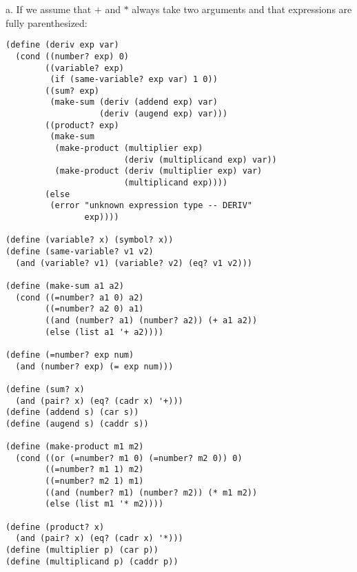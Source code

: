 \documentclass[a4paper,12pt]{article}
\begin{document}
a. If we assume that $+$ and $*$ always take two arguments and
that expressions are fully parenthesized:
\begin{lstlisting}
(define (deriv exp var)
  (cond ((number? exp) 0)
        ((variable? exp)
         (if (same-variable? exp var) 1 0))
        ((sum? exp)
         (make-sum (deriv (addend exp) var)
                   (deriv (augend exp) var)))
        ((product? exp)
         (make-sum
          (make-product (multiplier exp)
                        (deriv (multiplicand exp) var))
          (make-product (deriv (multiplier exp) var)
                        (multiplicand exp)))) 
        (else
         (error "unknown expression type -- DERIV"
                exp))))

(define (variable? x) (symbol? x))
(define (same-variable? v1 v2)
  (and (variable? v1) (variable? v2) (eq? v1 v2)))

(define (make-sum a1 a2)
  (cond ((=number? a1 0) a2)
        ((=number? a2 0) a1)
        ((and (number? a1) (number? a2)) (+ a1 a2))
        (else (list a1 '+ a2))))

(define (=number? exp num)
  (and (number? exp) (= exp num)))

(define (sum? x)
  (and (pair? x) (eq? (cadr x) '+)))
(define (addend s) (car s))
(define (augend s) (caddr s))

(define (make-product m1 m2)
  (cond ((or (=number? m1 0) (=number? m2 0)) 0)
        ((=number? m1 1) m2)
        ((=number? m2 1) m1)
        ((and (number? m1) (number? m2)) (* m1 m2))
        (else (list m1 '* m2))))

(define (product? x)
  (and (pair? x) (eq? (cadr x) '*)))
(define (multiplier p) (car p))
(define (multiplicand p) (caddr p))
\end{lstlisting}
\end{document}
